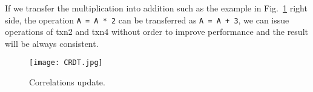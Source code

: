 If we transfer the multiplication into addition such as the example in Fig.~\ref{fig:crdt} right side, the operation \texttt{A = A * 2} can be transferred as \texttt{A = A + 3}, we can issue operations of txn2 and txn4 without order to improve performance and the result will be always consistent.
\begin{figure}[htbp]
  \centering
  \texttt{[image: CRDT.jpg]}\\
  \caption{Correlations update.}\label{fig:crdt}
\end{figure}

